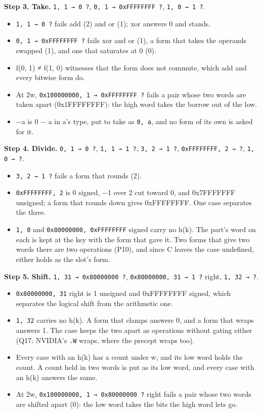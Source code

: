 \textbf{Step 3. Take.} \texttt{1, 1 → 0 ?}, \texttt{0, 1 → 0x\allowbreak{}FFFFFFFF ?}, \texttt{1, 0 → 1 ?}.

\begin{itemize}
\item \texttt{1, 1 → 0 ?} fails add (2) and or (1); xor answers 0 and stands.
\item \texttt{0, 1 → 0x\allowbreak{}FFFFFFFF ?} fails xor and or (1), a form that takes the operands swapped (1), and one that saturates at 0 (0).
\item f(0, 1) ≠ f(1, 0) witnesses that the form does not commute, which add and every bitwise form do.
\item At 2w, \texttt{0x100000000, 1 → 0x\allowbreak{}FFFFFFFF ?} fails a pair whose two words are taken apart (0x1FFFFFFFF): the high word takes the borrow out of the low.
\item −a is 0 − a in a's type, put to take as \texttt{0, a}, and no form of its own is asked for it.
\end{itemize}

\textbf{Step 4. Divide.} \texttt{0, 1 → 0 ?}, \texttt{1, 1 → 1 ?}, \texttt{3, 2 → 1 ?}, \texttt{0x\allowbreak{}FFFFFFFF, 2 → ?}, \texttt{1, 0 → ?}.

\begin{itemize}
\item \texttt{3, 2 → 1 ?} fails a form that rounds (2).
\item \texttt{0x\allowbreak{}FFFFFFFF, 2} is 0 signed, −1 over 2 cut toward 0, and 0x7FFFFFFF unsigned; a form that rounds down gives 0xFFFFFFFF. One case separates the three.
\item \texttt{1, 0} and \texttt{0x80000000, 0x\allowbreak{}FFFFFFFF} signed carry no h(k). The part's word on each is kept at the key with the form that gave it. Two forms that give two words there are two operations (P10), and since C leaves the case undefined, either holds as the slot's form.
\end{itemize}

\textbf{Step 5. Shift.} \texttt{1, 31 → 0x80000000 ?}, \texttt{0x80000000, 31 → 1 ?} right, \texttt{1, 32 → ?}.

\begin{itemize}
\item \texttt{0x80000000, 31} right is 1 unsigned and 0xFFFFFFFF signed, which separates the logical shift from the arithmetic one.
\item \texttt{1, 32} carries no h(k). A form that clamps answers 0, and a form that wraps answers 1. The case keeps the two apart as operations without gating either (Q17: NVIDIA's \texttt{.\allowbreak{}W} wraps, where the precept wraps too).
\item Every case with an h(k) has a count under w, and its low word holds the count. A count held in two words is put as its low word, and every case with an h(k) answers the same.
\item At 2w, \texttt{0x100000000, 1 → 0x80000000 ?} right fails a pair whose two words are shifted apart (0): the low word takes the bits the high word lets go.
\end{itemize}

